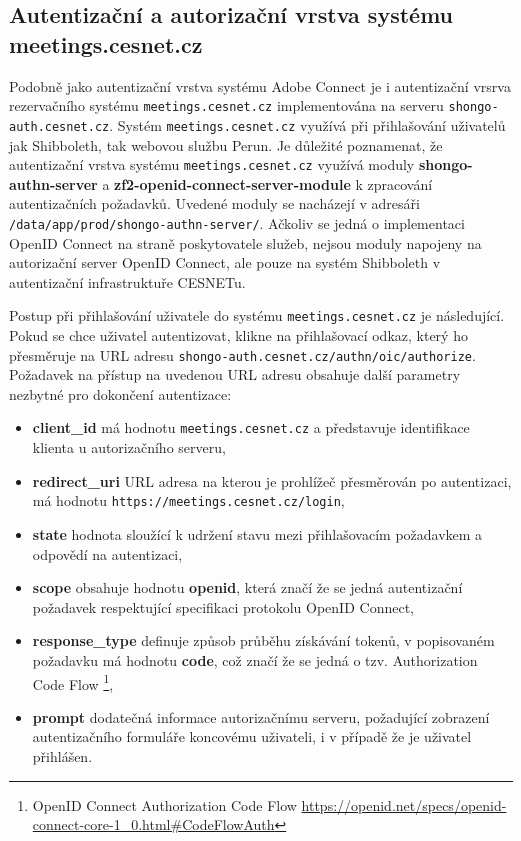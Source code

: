\documentclass[
  printed, %
  twoside, %
  table,   %
  nolof,     %
  nolot,     %
]{fithesis3}
\begin{document}
\subsection{Autentizační a autorizační vrstva systému meetings.cesnet.cz}
\label{meetings-old}
Podobně jako autentizační vrstva systému Adobe Connect je i autentizační vrsrva rezervačního systému \texttt{meetings.cesnet.cz} implementována na serveru \texttt{shongo-auth.cesnet.cz}. Systém \texttt{meetings.cesnet.cz} využívá při přihlašování uživatelů jak Shibboleth, tak webovou službu Perun. Je důležité poznamenat, že autentizační vrstva systému \texttt{meetings.cesnet.cz} využívá moduly \textbf{shongo-authn-server} a \textbf{zf2-openid-connect-server-module} k zpracování autentizačních požadavků. Uvedené moduly se nacházejí v adresáři \texttt{/data/app/prod/shongo-authn-server/}. Ačkoliv se jedná o implementaci OpenID Connect na straně poskytovatele služeb, nejsou moduly napojeny na autorizační server OpenID Connect, ale pouze na systém Shibboleth v autentizační infrastruktuře CESNETu. \par

Postup při přihlašování uživatele do systému \texttt{meetings.cesnet.cz} je následující. Pokud se chce uživatel autentizovat, klikne na přihlašovací odkaz, který ho přesměruje na URL adresu \texttt{shongo-auth.cesnet.cz/authn/oic/authorize}. Požadavek na přístup na uvedenou URL adresu obsahuje další parametry nezbytné pro dokončení autentizace:
\label{shongo:state}
\begin{itemize}
    \item \textbf{client\_id} má hodnotu \texttt{meetings.cesnet.cz} a představuje identifikace klienta u autorizačního serveru,
    \item \textbf{redirect\_uri} URL adresa na kterou je prohlížeč přesměrován po autentizaci, má hodnotu \texttt{https://meetings.cesnet.cz/login}, 
    \item \textbf{state} hodnota sloužící k udržení stavu mezi přihlašovacím požadavkem a odpovědí na autentizaci, 
    \item \textbf{scope} obsahuje hodnotu \textbf{openid}, která značí že se jedná autentizační požadavek respektující specifikaci protokolu OpenID Connect,
    \item \textbf{response\_type} definuje způsob průběhu získávání tokenů, v popisovaném požadavku má hodnotu \textbf{code}, což značí že se jedná o tzv. Authorization Code Flow \footnote{OpenID Connect Authorization Code Flow \url{https://openid.net/specs/openid-connect-core-1_0.html\#CodeFlowAuth}},
    \item \textbf{prompt} dodatečná informace autorizačnímu serveru, požadující zobrazení autentizačního formuláře koncovému uživateli, i v případě že je uživatel přihlášen. 
\end{itemize}
\end{document}
